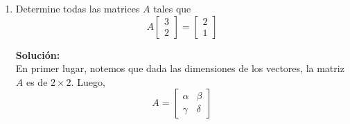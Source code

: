 \documentclass[12pt]{article}
\newenvironment{solucion}
{\begin{mdframed}[backgroundcolor=black!10]
		{\bf Solución:}\\
	}
	{
	\end{mdframed}
}
\newenvironment{preguntas}
{\begin{enumerate}\itemsep12pt
	}
	{
	\end{enumerate}
}
\newcommand{\widesim}[2][1.5]{
	\mathrel{\overset{#2}{\scalebox{#1}[1]{$\sim$}}}
}
\newcommand{\wsim}{\widesim{}}
\begin{document}
\begin{preguntas}
\begin{solucion}
Notemos que la matriz de la transformación es
		$$ A = \begin{bmatrix}
		5 &- 3\\
		4& -1\\
		2& 3
		\end{bmatrix}$$
		Por que debemos resolver el sistema
		$$ \begin{bmatrix}
		5 &- 3\\
		4& -1\\
		2& 3
		\end{bmatrix}\begin{bmatrix}
		x_1\\
		x_2
		\end{bmatrix} = \begin{bmatrix}
		13\\
		9\\
		1
		\end{bmatrix}$$
		Viendolo en forma matricial,
		$$\left[
		\begin{array}{cc|c}
		5 &- 3 & 13\\
		4 & -1 & 9\\
		2 & 3 & 1
		\end{array}
		\right] \stackrel{F.E.R}{\wsim} \left[
		\begin{array}{cc|c}
		1 & 0 & 2\\
		0 & 1 & -1\\
		0 & 0 & 0
		\end{array}
		\right]$$
		Por lo que
		$$x_1 = 2, \quad x_2 = -1$$
		Finalmente,
		$$x = \begin{bmatrix}
		2 \\ -1
		\end{bmatrix}$$
\end{solucion}
\item Determine todas las matrices $A$ tales que
	$$ A\begin{bmatrix}
	3\\
	2
	\end{bmatrix}=\begin{bmatrix}
	2\\
	1
	\end{bmatrix}$$
\begin{solucion}
En primer lugar, notemos que dada las dimensiones de los vectores, la matriz $A$ es de $2 \times 2$. Luego,
		$$A = \begin{bmatrix}
		\alpha & \beta \\
		\gamma &\delta
		\end{bmatrix}$$

\end{solucion}
\end{preguntas}
\end{document}
